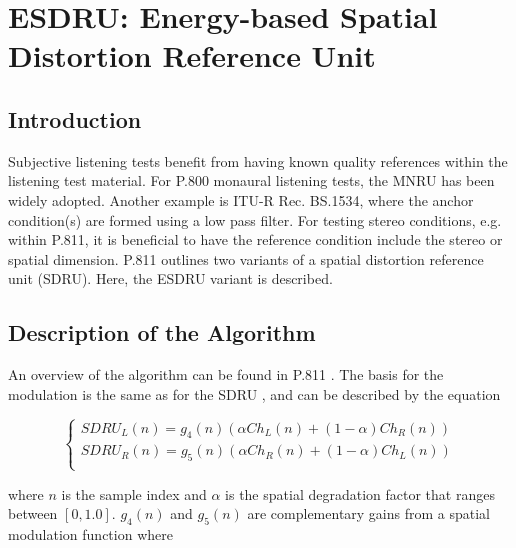 
\chapter{ESDRU: Energy-based Spatial Distortion Reference Unit}

\section{Introduction}

Subjective listening tests benefit from having known quality references within
the listening test material. For P.800 monaural listening tests, the MNRU has
been widely adopted. Another example is ITU-R Rec. BS.1534, where the anchor condition(s)
are formed using a low pass filter. For testing stereo conditions, e.g. within
P.811, it is beneficial to have the reference condition include the stereo or 
spatial dimension. P.811 outlines two variants of a spatial distortion reference
unit (SDRU). Here, the ESDRU variant is described.



\section{Description of the Algorithm}


An overview of the algorithm can be found in P.811 \cite{P.811}. The basis for
the modulation is the same as for the SDRU \cite{SDRU}, and can be described by
the equation

  \[
    \left\{
       \begin{array}{ll}
         {SDRU}_L(n) = g_4(n) \left( \alpha Ch_L(n)+(1-\alpha)Ch_R(n) \right) \\
         {SDRU}_R(n) = g_5(n) \left( \alpha Ch_R(n)+(1-\alpha)Ch_L(n) \right) \\
       \end{array}
     \right.
  \]

where $n$ is the sample index and $\alpha$ is the spatial degradation factor that
ranges between $[0,1.0]$. $g_4(n)$ and $g_5(n)$ are complementary gains from a
spatial modulation function where
 
